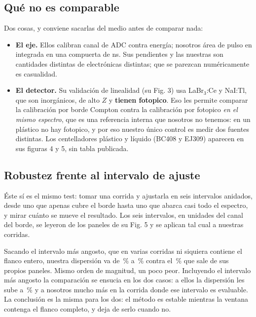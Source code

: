 \documentclass[11pt,a4paper]{article}
\begin{document}
\subsection{Qué no es comparable}

Dos cosas, y conviene sacarlas del medio antes de comparar nada:

\begin{itemize}
\item \textbf{El eje.} Ellos calibran canal de ADC contra energía; nosotros
      área de pulso en \mVns{} integrada en una compuerta de \PostFijo{} ns.
      Sus pendientes y las nuestras son cantidades distintas de electrónicas
      distintas; que se parezcan numéricamente es casualidad.
\item \textbf{El detector.} Su validación de linealidad (su Fig. 3) usa
      LaBr$_3$:Ce y NaI:Tl, que son inorgánicos, de alto $Z$ y \textbf{tienen
      fotopico}. Eso les permite comparar la calibración por borde Compton
      contra la calibración por fotopico \emph{en el mismo espectro}, que es
      una referencia interna que nosotros no tenemos: en un plástico no hay
      fotopico, y por eso nuestro único control es medir dos fuentes distintas.
      Los centelladores plástico y líquido (BC408 y EJ309) aparecen en sus
      figuras 4 y 5, sin tabla publicada.
\end{itemize}

\subsection{Robustez frente al intervalo de ajuste}

Éste sí es el mismo test: tomar una corrida y ajustarla en seis intervalos
anidados, desde uno que apenas cubre el borde hasta uno que abarca casi todo el
espectro, y mirar cuánto se mueve el resultado. Los seis intervalos, en
unidades del canal del borde, se leyeron de los paneles de su Fig. 5 y se
aplican tal cual a nuestras corridas.

\begin{table}[htbp]
\centering
\caption{El test de la Fig. 5 del paper, sobre nuestras corridas y sobre la
suya.}
\label{tab:robustez}
{\small}
\end{table}

Sacando el intervalo más angosto, que en varias corridas ni siquiera contiene
el flanco entero, nuestra dispersión va de \RobustezNuestraMin\,\% a
\RobustezNuestraMax\,\% contra el \RobustezPaperSinAngosta\,\% que sale de sus
propios paneles. Mismo orden de magnitud, un poco peor. Incluyendo el intervalo
más angosto la comparación se ensucia en los dos casos: a ellos la dispersión
les sube a \RobustezPaper\,\% y a nosotros mucho más en la corrida donde ese
intervalo es evaluable. La conclusión es la misma para los dos: el método es
estable mientras la ventana contenga el flanco completo, y deja de serlo cuando
no.
\end{document}
